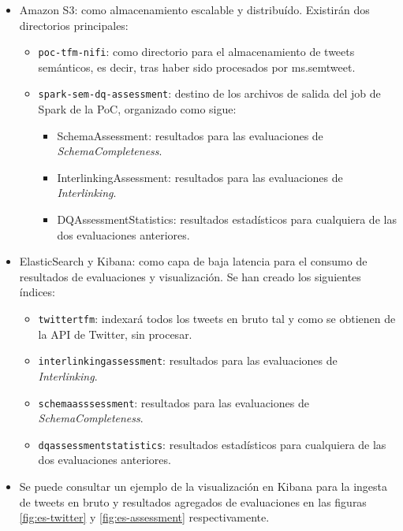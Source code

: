 \begin{itemize}
\item Amazon S3: como almacenamiento escalable y distribuído. Existirán dos
  directorios principales: 
  \begin{itemize}
  \item \texttt{poc-tfm-nifi}: como directorio para el almacenamiento de tweets
    semánticos, es decir, tras haber sido procesados por ms.semtweet.
  \item \texttt{spark-sem-dq-assessment}: destino de los archivos de salida del
    job de Spark de la \acs{PoC}, organizado como sigue:
    \begin{itemize}
    \item SchemaAssessment: resultados para las evaluaciones de
      \textit{SchemaCompleteness}. 
    \item InterlinkingAssessment: resultados para las evaluaciones de \textit{Interlinking}.
    \item DQAssessmentStatistics: resultados estadísticos para cualquiera de las
      dos evaluaciones anteriores. 
    \end{itemize}
  \end{itemize}
\item ElasticSearch y Kibana: como capa de baja latencia para el consumo de
  resultados de evaluaciones y visualización. Se han creado los siguientes
  índices:

  \begin{itemize}

  \item \texttt{twittertfm}: indexará todos los tweets en bruto tal y como se
    obtienen de la \acs{API} de Twitter, sin procesar. 

  \item \texttt{interlinkingassessment}: resultados para las evaluaciones de
    \textit{Interlinking}. 
  \item \texttt{schemaasssessment}: resultados para las evaluaciones de
    \textit{SchemaCompleteness}.
  \item \texttt{dqassessmentstatistics}: resultados estadísticos para cualquiera
    de las dos evaluaciones anteriores. 
  \end{itemize}

\item Se puede consultar un ejemplo de la visualización en Kibana para la
  ingesta de tweets en bruto y resultados agregados de evaluaciones en las figuras
  \ref{fig:es-twitter} y \ref{fig:es-assessment} respectivamente. 

\end{itemize}

